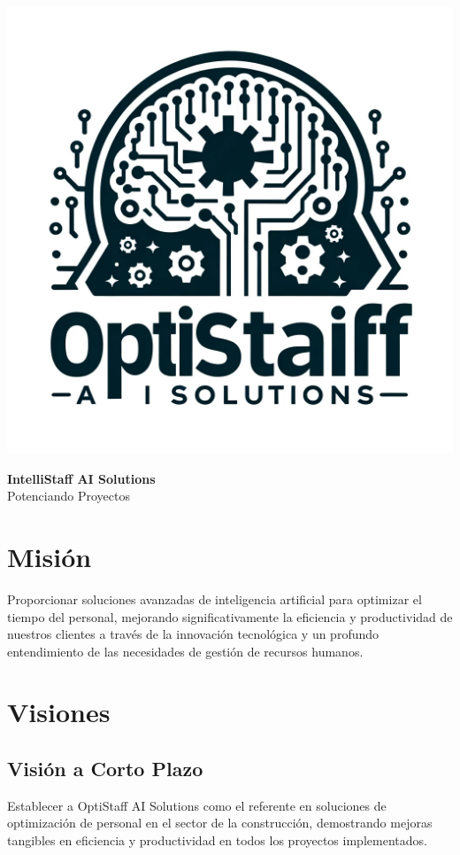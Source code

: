 \documentclass{article}
\author{Equipo 32: \\
Ismael Rufino Grajeda Marin \\
xxx\\
xxx\\
xxx\\
}
\date{2 de marzo de 2024}
\begin{document}
\noindent
\begin{minipage}{0.3\textwidth}
    \includegraphics[width=\textwidth]{logo_empresa.jpeg}
\end{minipage}%
\begin{minipage}{0.7\textwidth}
    {\Large \textbf{IntelliStaff AI Solutions}}\\[1ex]
    {\large Potenciando Proyectos}
\end{minipage}

\bigskip 

\section{Misión}
Proporcionar soluciones avanzadas de inteligencia artificial para optimizar el tiempo del personal, mejorando significativamente la eficiencia y productividad de nuestros clientes a través de la innovación tecnológica y un profundo entendimiento de las necesidades de gestión de recursos humanos.

\section{Visiones}
\subsection{Visión a Corto Plazo}
Establecer a OptiStaff AI Solutions como el referente en soluciones de optimización de personal en el sector de la construcción, demostrando mejoras tangibles en eficiencia y productividad en todos los proyectos implementados.
\end{document}
